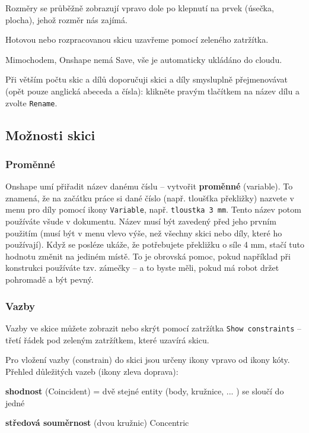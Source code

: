 Rozměry se průběžně zobrazují vpravo dole po klepnutí na prvek (úsečka, plocha), jehož rozměr nás zajímá. 

Hotovou nebo rozpracovanou skicu uzavřeme pomocí zeleného zatržítka. 

Mimochodem, Onshape nemá Save, vše je automaticky ukládáno do cloudu.

Při větším počtu skic a dílů doporučuji skici a díly smysluplně přejmenovávat (opět pouze anglická abeceda a čísla): klikněte pravým tlačítkem na název dílu a zvolte {\tt Rename}.

\subsection{Možnosti skici} \label{skica:možnosti}


\subsubsection{Proměnné}

Onshape umí přiřadit název danému číslu -- vytvořit \textbf{proměnné} (variable). 
To znamená, že na začátku práce si dané číslo (např. tloušťka překližky) nazvete v menu pro díly pomocí ikony {\tt Variable}, např. {\tt tloustka  3 mm}. 
Tento název potom používáte všude v dokumentu. 
Název musí být zavedený před jeho prvním použitím (musí být v menu vlevo výše, než všechny skici nebo  díly, které ho používají).
Když se posléze ukáže, že potřebujete překližku o síle 4 mm, stačí tuto hodnotu změnit na jediném místě. 
To je obrovská pomoc, pokud například při konstrukci používáte tzv. zámečky -- a to byste měli, pokud má robot držet pohromadě a být pevný. 

\subsubsection{Vazby}

Vazby ve skice můžete zobrazit nebo skrýt pomocí zatržítka {\tt Show constraints} -- třetí řádek pod zeleným zatržítkem, které uzavírá skicu. 

Pro vložení vazby (constrain) do skici jsou určeny ikony vpravo od ikony kóty. 
Přehled důležitých vazeb (ikony zleva doprava): 

\textbf{shodnost} (Coincident)  = dvě stejné entity (body, kružnice, ... ) se sloučí do jedné

\textbf{středová souměrnost} (dvou kružnic)  Concentric 

